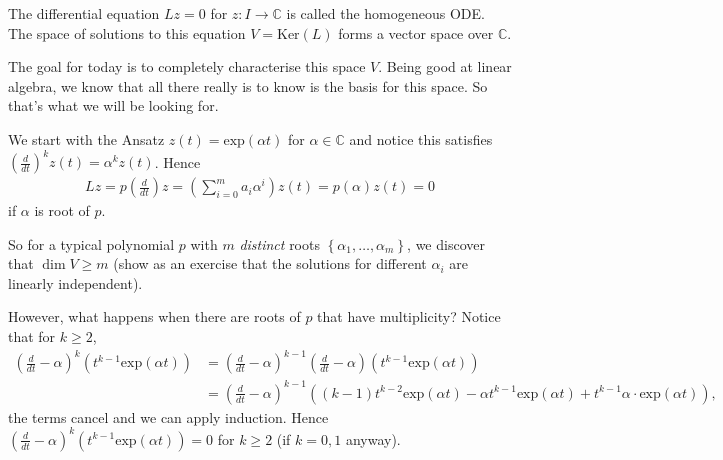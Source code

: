 \begin{definition}\label{def:homogen-ode}
    The differential equation $L z = 0$ for $z: I \to \mathbb{C}$ is called the homogeneous ODE. The space of solutions to this equation $V = \text{Ker}(L)$ forms a vector space over $\mathbb{C}$.
\end{definition}

The goal for today is to completely characterise this space $V$. Being good at linear algebra, we know that all there really is to know is the basis for this space. So that's what we will be looking for. 

We start with the Ansatz $z(t) = \text{exp}(\alpha t)$ for $\alpha \in \mathbb{C}$ and notice this satisfies $\left( \frac{d}{dt} \right)^{k} z(t) = \alpha^{k} z(t)$. Hence
\begin{align*}
    Lz = p \left( \frac{d}{dt} \right) z = \left( \sum_{i=0}^{m} a_{i} \alpha^{i} \right)  z(t) = p(\alpha ) z(t) = 0
\end{align*}
if $\alpha$ is root of $p$. 

So for a typical polynomial $p$ with $m$ \textit{distinct} roots $\left\{ \alpha_{1}, \dots, \alpha_{m} \right\}$, we discover that $\dim V \geq m$ (show as an exercise that the solutions for different $\alpha_{i}$ are linearly independent).

However, what happens when there are roots of $p$ that have multiplicity? Notice that for $k \geq 2$,
\begin{align*}
    \left( \frac{d}{dt} - \alpha  \right)^{k} (t^{k-1} \text{exp}(\alpha t)) &= \left( \frac{d}{dt} - \alpha  \right)^{k-1}\left( \frac{d}{dt} - \alpha \right)(t^{k-1} \text{exp}(\alpha t)) \\ 
    &= \left( \frac{d}{dt} - \alpha  \right)^{k-1} ((k-1) t^{k-2} \text{exp}(\alpha t) - \alpha t^{k-1} \text{exp}(\alpha t) + t^{k-1}\alpha \cdot \text{exp}(\alpha t)),
\end{align*}
the terms cancel and we can apply induction. Hence $\left( \frac{d}{dt} - \alpha  \right)^{k}(t^{k-1} \text{exp}(\alpha t)) = 0$ for $k \geq 2$ (if $k=0,1$ anyway). 

